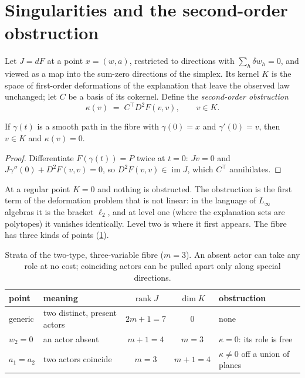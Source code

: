 \documentclass[11pt]{article}
\theoremstyle{definition}\newtheorem{definition}[theorem]{Definition}\newtheorem{remark}[theorem]{Remark}\newtheorem{example}[theorem]{Example}
\DeclareMathOperator{\rank}{rank}\DeclareMathOperator{\im}{im}\DeclareMathOperator{\coker}{coker}\DeclareMathOperator{\Spec}{Spec}
\begin{document}
\section{Singularities and the second-order obstruction}\label{sec:singular}

Let $J=dF$ at a point $x=(w,a)$, restricted to directions with $\sum_h\delta w_h=0$, and viewed as a map into the sum-zero directions of
the simplex. Its kernel $K$ is the space of first-order deformations of the explanation that leave the observed law unchanged; let $C$ be
a basis of its cokernel. Define the \emph{second-order obstruction}
\[
  \kappa(v) \;=\; C^{\!\top} D^2F(v,v),\qquad v\in K.
\]

\begin{proposition}\label{prop:kur}
If $\gamma(t)$ is a smooth path in the fibre with $\gamma(0)=x$ and $\gamma'(0)=v$, then $v\in K$ and $\kappa(v)=0$.
\end{proposition}

\begin{proof}
Differentiate $F(\gamma(t))=P$ twice at $t=0$: $J v=0$ and $J\gamma''(0)+D^2F(v,v)=0$, so $D^2F(v,v)\in\im J$, which $C^{\!\top}$
annihilates.
\end{proof}

At a regular point $K=0$ and nothing is obstructed. The obstruction is the first term of the deformation problem that is not linear:
in the language of $L_\infty$ algebras \cite{LadaStasheff1993} it is the bracket $\ell_2$, and at level one (where the explanation sets are polytopes) it
vanishes identically. Level two is where it first appears. The fibre has three kinds of points (\cref{tab:strata}).

\begin{table}[!htbp]\centering\small
\begin{tabular}{llccl}\toprule
point & meaning & $\rank J$ & $\dim K$ & obstruction\\\midrule
generic & two distinct, present actors & $2m+1=7$ & 0 & none\\
$w_2=0$ & an actor absent & $m+1=4$ & $m=3$ & $\kappa=0$: its role is free\\
$a_1=a_2$ & two actors coincide & $m=3$ & $m+1=4$ & $\kappa\neq 0$ off a union of planes\\\bottomrule
\end{tabular}
\caption{Strata of the two-type, three-variable fibre ($m=3$). An absent actor can take any role at no cost; coinciding actors can be
pulled apart only along special directions.}\label{tab:strata}
\end{table}
\end{document}
